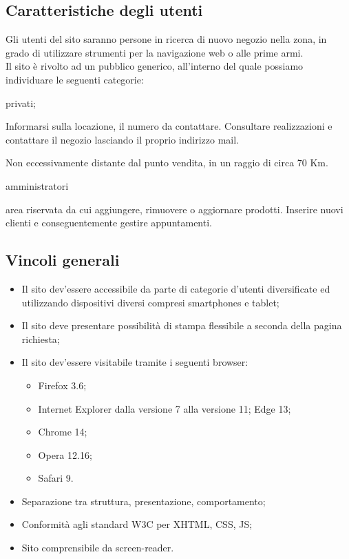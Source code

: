\subsection{Caratteristiche degli utenti}{
	Gli utenti del sito saranno persone in ricerca di nuovo negozio nella zona, in grado di utilizzare strumenti per la navigazione web o alle prime armi. \\
	Il sito è rivolto ad un pubblico generico, all'interno del quale possiamo individuare le seguenti categorie:
	\begin{description}\itemsep1pt
		\item[Categoria di utenti:] privati;
		\begin{description}\itemsep1pt
			\item[Funzionalità:] Informarsi sulla locazione, il numero da contattare. Consultare realizzazioni e contattare il negozio lasciando il proprio indirizzo mail.
			\item[Termini generali:] Non eccessivamente distante dal punto vendita, in un raggio di circa 70 Km.
		\end{description}
		\item[Categoria di utenti:] amministratori
		\begin{description}\itemsep1pt
			\item[Funzionalità:] area riservata da cui aggiungere, rimuovere o aggiornare prodotti. Inserire nuovi clienti e conseguentemente gestire appuntamenti. 
		\end{description}
	\end{description}
	\subsection{Vincoli generali}{
		\begin{itemize}\itemsep1pt
			\item Il sito dev'essere accessibile da parte di categorie d'utenti diversificate ed utilizzando dispositivi diversi compresi smartphones e tablet;
			\item Il sito deve presentare possibilità di stampa flessibile a seconda della pagina richiesta;
			\item Il sito dev'essere visitabile tramite i seguenti browser: 
			\begin{itemize}
				\item Firefox 3.6;
				\item Internet Explorer dalla versione 7 alla versione 11; Edge 13;
				\item Chrome 14;
				\item Opera 12.16;
				\item Safari 9.
			\end{itemize}
			\item Separazione tra struttura, presentazione, comportamento;
			\item Conformità agli standard W3C per XHTML, CSS, JS;
			\item Sito comprensibile da screen-reader.
		\end{itemize}
	}
}
